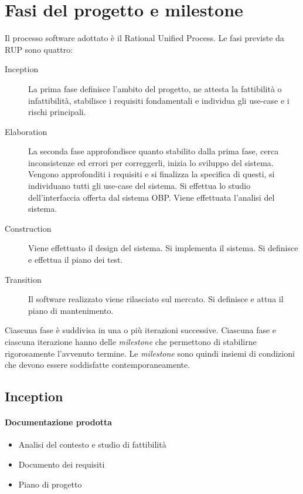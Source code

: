 \section{Fasi del progetto e milestone}

Il processo software adottato \`e il Rational Unified Process.
Le fasi previste da RUP sono quattro:
\begin{description}
	\item[Inception]
	La prima fase definisce l'ambito del progetto, ne attesta la fattibilit\`a o infattibilit\`a, stabilisce i requisiti fondamentali e individua gli use-case e i rischi principali.
	\item[Elaboration]
	La seconda fase approfondisce quanto stabilito dalla prima fase, cerca inconsistenze ed errori per correggerli, inizia lo sviluppo del sistema.
	Vengono approfonditi i requisiti e si finalizza la specifica di questi, si individuano tutti gli use-case del sistema.
	Si effettua lo studio dell'interfaccia offerta dal sistema OBP.
	Viene effettuata l'analisi del sistema.
	\item[Construction]
	Viene effettuato il design del sistema.
	Si implementa il sistema.
	Si definisce e effettua il piano dei test.
	\item[Transition]
	Il software realizzato viene rilasciato sul mercato.
	Si definisce e attua il piano di mantenimento.
\end{description}

Ciascuna fase \`e suddivisa in una o pi\`u iterazioni successive.
Ciascuna fase e ciascuna iterazione hanno delle \emph{milestone} che permettono di stabilirne rigorosamente l'avvenuto termine.
Le \emph{milestone} sono quindi insiemi di condizioni che devono essere soddisfatte contemporaneamente.

\subsection{Inception}

\paragraph{Documentazione prodotta}
\begin{itemize}
	\item Analisi del contesto e studio di fattibilit\`a
	\item Documento dei requisiti
	\item Piano di progetto
\end{itemize}

